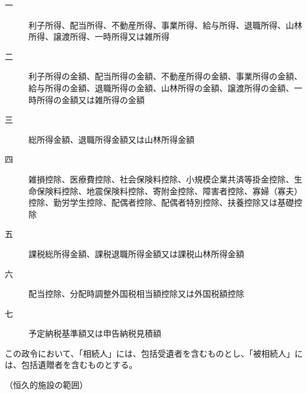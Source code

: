 \documentclass[twocolumn,a4j,10pt]{ltjtarticle}
\begin{document}
\begin{description}
\begin{description}
\item[一]利子所得、配当所得、不動産所得、事業所得、給与所得、退職所得、山林所得、譲渡所得、一時所得又は雑所得
\item[二]利子所得の金額、配当所得の金額、不動産所得の金額、事業所得の金額、給与所得の金額、退職所得の金額、山林所得の金額、譲渡所得の金額、一時所得の金額又は雑所得の金額
\item[三]総所得金額、退職所得金額又は山林所得金額
\item[四]雑損控除、医療費控除、社会保険料控除、小規模企業共済等掛金控除、生命保険料控除、地震保険料控除、寄附金控除、障害者控除、寡婦（寡夫）控除、勤労学生控除、配偶者控除、配偶者特別控除、扶養控除又は基礎控除
\item[五]課税総所得金額、課税退職所得金額又は課税山林所得金額
\item[六]配当控除、分配時調整外国税相当額控除又は外国税額控除
\item[七]予定納税基準額又は申告納税見積額
\end{description}
\item[\rensuji{3}]この政令において、「相続人」には、包括受遺者を含むものとし、「被相続人」には、包括遺贈者を含むものとする。
\end{description}
\noindent\hspace{10pt}（恒久的施設の範囲）
\end{document}
